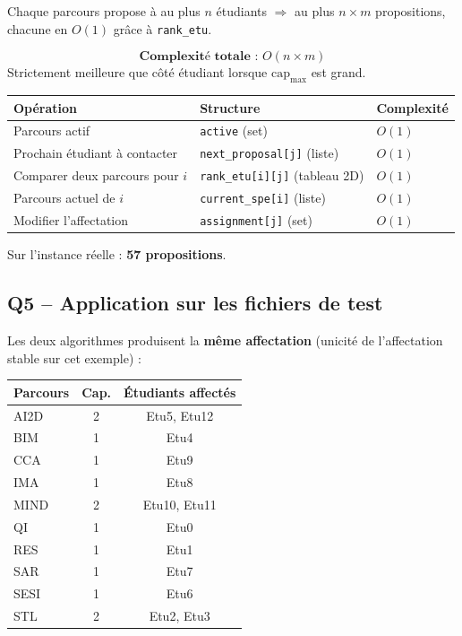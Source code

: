 \documentclass[11pt,a4paper]{article}
\begin{document}
Chaque parcours propose à au plus $n$ étudiants $\Rightarrow$ au plus $n \times m$ propositions, chacune en $O(1)$ grâce à \texttt{rank\_etu}.

\[
  \textbf{Complexité totale : } O(n \times m)
\]
Strictement meilleure que côté étudiant lorsque $\mathrm{cap}_{\max}$ est grand.

\begin{center}
\begin{tabular}{lll}
\toprule
\textbf{Opération} & \textbf{Structure} & \textbf{Complexité} \\
\midrule
Parcours actif & \texttt{active} (set) & $O(1)$ \\
Prochain étudiant à contacter & \texttt{next\_proposal[j]} (liste) & $O(1)$ \\
Comparer deux parcours pour $i$ & \texttt{rank\_etu[i][j]} (tableau 2D) & $O(1)$ \\
Parcours actuel de $i$ & \texttt{current\_spe[i]} (liste) & $O(1)$ \\
Modifier l'affectation & \texttt{assignment[j]} (set) & $O(1)$ \\
\bottomrule
\end{tabular}
\end{center}

Sur l'instance réelle : \textbf{57 propositions}.

\subsection*{Q5 -- Application sur les fichiers de test}

Les deux algorithmes produisent la \textbf{même affectation} (unicité de l'affectation stable sur cet exemple) :

\begin{center}
\begin{tabular}{lcc}
\toprule
\textbf{Parcours} & \textbf{Cap.} & \textbf{Étudiants affectés} \\
\midrule
AI2D & 2 & Etu5, Etu12 \\
BIM & 1 & Etu4 \\
CCA & 1 & Etu9 \\
IMA & 1 & Etu8 \\
MIND & 2 & Etu10, Etu11 \\
QI & 1 & Etu0 \\
RES & 1 & Etu1 \\
SAR & 1 & Etu7 \\
SESI & 1 & Etu6 \\
STL & 2 & Etu2, Etu3 \\
\bottomrule
\end{tabular}
\end{center}
\end{document}
